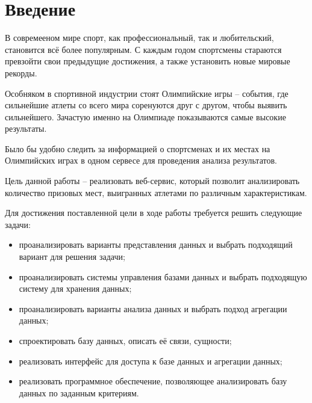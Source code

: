 \chapter*{Введение}


	В совремееном мире спорт, как профессиональный, так и любительский, становится всё более популярным. С каждым годом спортсмены стараются превзойти свои предыдущие достижения, а также установить новые мировые рекорды. 
	
	Особняком в спортивной индустрии стоят Олимпийские игры \cite{olympic-inf} -- события, где сильнейшие атлеты со всего мира соренуются друг с другом, чтобы выявить сильнейшего. Зачастую именно на Олимпиаде показываются самые высокие результаты.
	
	Было бы удобно следить за информацией о спортсменах и их местах на Олимпийских играх в одном сервесе для проведения анализа результатов.
	
	Цель данной работы – реализовать веб-сервис, который позволит анализировать количество призовых мест, выигранных атлетами по различным характеристикам.
	
	Для достижения поставленной цели в ходе работы требуется решить следующие задачи:
	
	\begin{itemize}
		
		\item проанализировать варианты представления данных и выбрать подходящий вариант для решения задачи;
		
		\item проанализировать системы управления базами данных и выбрать подходящую систему для хранения данных;
		
		\item проанализировать варианты анализа данных и выбрать подход агрегации данных;
		
		\item спроектировать базу данных, описать её связи, сущности;
		
		\item реализовать интерфейс для доступа к базе данных и агрегации данных;
		
		\item реализовать программное обеспечение, позволяющее анализировать базу данных по заданным критериям.
	
	\end{itemize}
	
	
	
	
	